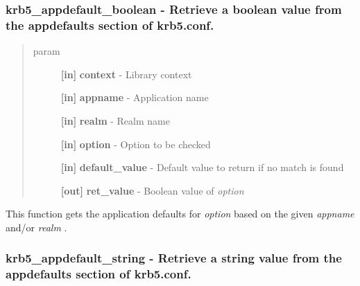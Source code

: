 \documentclass[letterpaper,10pt,english]{sphinxmanual}
\begin{document}
\subsubsection{krb5\_appdefault\_boolean -  Retrieve a boolean value from the appdefaults section of krb5.conf.}
\label{appdev/refs/api/krb5_appdefault_boolean::doc}\label{appdev/refs/api/krb5_appdefault_boolean:krb5-appdefault-boolean-retrieve-a-boolean-value-from-the-appdefaults-section-of-krb5-conf}

\begin{fulllineitems}
\label{appdev/refs/api/krb5_appdefault_boolean:c.krb5_appdefault_boolean}
\end{fulllineitems}

\begin{quote}\begin{description}
\item[{param}] \leavevmode
\textbf{{[}in{]}} \textbf{context} - Library context

\textbf{{[}in{]}} \textbf{appname} - Application name

\textbf{{[}in{]}} \textbf{realm} - Realm name

\textbf{{[}in{]}} \textbf{option} - Option to be checked

\textbf{{[}in{]}} \textbf{default\_value} - Default value to return if no match is found

\textbf{{[}out{]}} \textbf{ret\_value} - Boolean value of \emph{option}

\end{description}\end{quote}

This function gets the application defaults for \emph{option} based on the given \emph{appname} and/or \emph{realm} .




{\hyperref[appdev/refs/api/krb5_appdefault_string:c.krb5_appdefault_string]{}}




\subsubsection{krb5\_appdefault\_string -  Retrieve a string value from the appdefaults section of krb5.conf.}
\label{appdev/refs/api/krb5_appdefault_string::doc}\label{appdev/refs/api/krb5_appdefault_string:krb5-appdefault-string-retrieve-a-string-value-from-the-appdefaults-section-of-krb5-conf}
\end{document}
